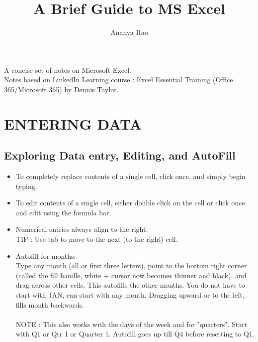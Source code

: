 \documentclass[11pt, oneside]{article}   	%
\title{A Brief Guide to MS Excel}
\author{Ananya Rao}
\begin{document}
\null  %
\nointerlineskip  %
\vfill
\let\snewpage \newpage
\let\newpage \relax
\maketitle
\begin{center}
A concise set of notes on Microsoft Excel. \\
 \bigskip
Notes based on LinkedIn Learning course : Excel Essential Training (Office 365/Microsoft 365) by Dennis Taylor.
\end{center}
\let \newpage \snewpage
\vfill 
\pagebreak
\tableofcontents
\section {ENTERING DATA} 
\subsection{Exploring Data entry, Editing, and AutoFill}
\begin{itemize}
\item To completely replace contents of a single cell, click once, and simply begin typing. 
\item To edit contents of a single cell, either double click on the cell or click once and edit using the formula bar. 
\item Numerical entries always align to the right.
\bigskip \\
\indent TIP : Use tab to move to the next (to the right) cell. \\
\item Autofill for months: \\
	Type any month (all or first three letters), point to the bottom right corner (called the fill handle, white + cursor now becomes thinner and black), and drag across other cells. This autofills the other months. You do not have to start with JAN, can start with any month. Dragging upward or to the left, fills month backwards. \\
	\bigskip \\
	\indent NOTE : This also works with the days of the week and for "quarters". Start with Q1 or Qtr 1 or Quarter 1. Autofill goes up till Q4 before resetting to Q1.
\end{itemize}
\end{document}
